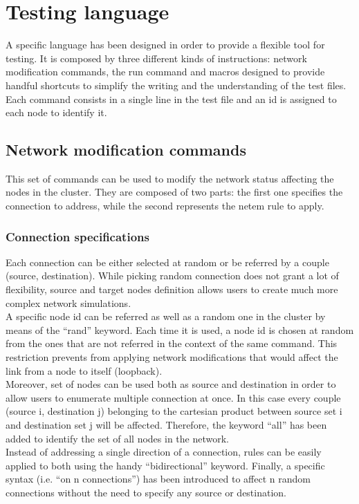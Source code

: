 \chapter{Testing language}\label{chp:testing_language}

A specific language has been designed in order to provide a flexible tool for testing. It is composed by three different kinds of instructions: network modification commands, the run command and macros designed to provide handful shortcuts to simplify the writing and the understanding of the test files. Each command consists in a single line in the test file and an id is assigned to each node to identify it.

\section{Network modification commands}
This set of commands can be used to modify the network status affecting the nodes in the cluster. They are composed of two parts: the first one specifies the connection to address, while the second represents the netem rule to apply.

\subsection{Connection specifications}
Each connection can be either selected at random or be referred by a couple (source, destination).
While picking random connection does not grant a lot of flexibility, source and target nodes definition allows users to create much more complex network simulations.\\
A specific node id can be referred as well as a random one in the cluster by means of the “rand” keyword. Each time it is used, a node id is chosen at random from the ones that are not referred in the context of the same command. This restriction prevents from applying network modifications that would affect the link from a node to itself (loopback).\\
Moreover, set of nodes can be used both as source and destination in order to allow users to enumerate multiple connection at once. In this case every couple (source i, destination j) belonging to the cartesian product between source set i and destination set j will be affected. Therefore, the keyword “all” has been added to identify the set of all nodes in the network.\\
Instead of addressing a single direction of a connection, rules can be easily applied to both using the handy “bidirectional” keyword.
Finally, a specific syntax (i.e. “on n connections”) has been introduced to affect n random connections without the need to specify any source or destination.


